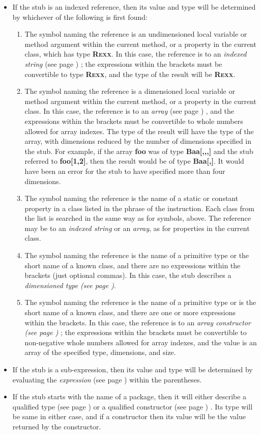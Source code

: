 \begin{itemize}
\item 
If the stub is an indexed reference, then its value and type will be
determined by whichever of the following is first found:
\begin{enumerate}
\item The symbol naming the reference is an undimensioned local variable
or method argument within the current method, or a property in the
current class, which has type \textbf{R\textsc{exx}}.  In this case, the
reference is to an  \emph{indexed string} (see page \pageref{refinstr}) ;
the expressions within the brackets must be convertible to
type \textbf{R\textsc{exx}}, and the type of the result will
be \textbf{R\textsc{exx}}.
\item The symbol naming the reference is a dimensioned local variable
or method argument within the current method, or a property in the
current class.
In this case, the reference is to an
 \emph{array} (see page \pageref{refarray}) , and the expressions within the
brackets must be convertible to whole numbers allowed for array indexes.
The type of the result will have the type of the array, with dimensions
reduced by the number of dimensions specified in the stub.
 For example, if the array \textbf{foo} was of
type \textbf{Baa[,,,]} and the stub referred
to \textbf{foo[1,2]}, then the result would be of
type \textbf{Baa[,]}.
It would have been an error for the stub to have specified more than
four dimensions.
\item The symbol naming the reference is the name of a static or constant
property in a class listed in the  phrase of the
 instruction.
Each class from the list is searched in the same way as for symbols,
above.  The reference may be to an \emph{indexed string} or an
\emph{array}, as for properties in the current class.
\item The symbol naming the reference is the name of a primitive type or
the short name of a known class, and there are no expressions within the
brackets (just optional commas).
In this case, the stub describes a  \emph{dimensioned type (see page \pageref{refdimtype})}.
\item The symbol naming the reference is the name of a primitive type or
is the short name of a known class, and there are one or more
expressions within the brackets.
In this case, the reference is to an  \emph{array constructor (see page \pageref{refarray}) }; the expressions within the brackets must
be convertible to non-negative whole numbers allowed for array indexes,
and the value is an array of the specified type, dimensions, and size.
\end{enumerate}
\item 
If the stub is a sub-expression, then its value and type will be
determined by evaluating the  \emph{expression} (see page \pageref{refexpr}) 
within the parentheses.
\item 
If the stub starts with the name of a package, then it will either
describe a qualified  type (see page \pageref{reftypes})  or a qualified
 constructor (see page \pageref{refcons}) .
Its type will be same in either case, and if a constructor then its
value will be the value returned by the constructor.
\end{itemize}
 
